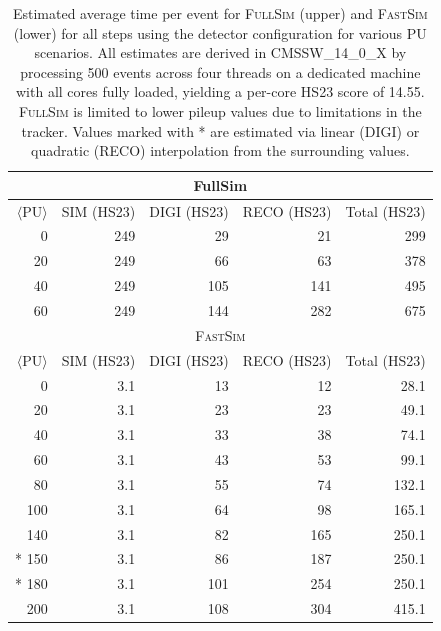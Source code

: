 \begin{table}[tbhp]
    \centering
	\caption{Estimated average time per event for \textsc{FullSim} (upper) and \textsc{FastSim} (lower) for all steps using the \PhaseOne detector configuration for various \gls{PU} scenarios. All estimates are derived in \gls{CMSSW}\_14\_0\_X by processing 500 events across four threads on a dedicated machine with all cores fully loaded, yielding a per-core HS23 score of 14.55. \textsc{FullSim} is limited to lower pileup values due to limitations in the \PhaseOne tracker. Values marked with * are estimated via linear (\gls{DIGI}) or quadratic (\gls{RECO}) interpolation from the surrounding values.}
    \begin{tabular}{|r|r|r|r|r|}
    \multicolumn{5}{c}{FullSim}\\
    \hline
     \rowcolor{tableheader} 
     $\langle \text{PU} \rangle$   & SIM (HS23) & DIGI (HS23) & RECO (HS23) & Total (HS23) \\ \hline
     \cellcolor{tablerowheader} 0  & 249        & 29          & 21          & 299 \\
     \cellcolor{tablerowheader} 20 & 249        & 66          & 63          & 378 \\
     \cellcolor{tablerowheader} 40 & 249        & 105         & 141         & 495 \\
     \cellcolor{tablerowheader} 60 & 249        & 144         & 282         & 675 \\
    \hline
    \multicolumn{5}{c}{\textsc{FastSim}}\\
    \hline
    \rowcolor{tableheader} 
    $\langle \text{PU} \rangle$    & SIM (HS23) & DIGI (HS23) & RECO (HS23) & Total (HS23) \\ \hline
    \cellcolor{tablerowheader}   0   & 3.1        & 13          & 12          & 28.1 \\
    \cellcolor{tablerowheader}   20  & 3.1        & 23          & 23          & 49.1 \\
    \cellcolor{tablerowheader}   40  & 3.1        & 33          & 38          & 74.1 \\
    \cellcolor{tablerowheader}   60  & 3.1        & 43          & 53          & 99.1 \\
    \cellcolor{tablerowheader}   80  & 3.1        & 55          & 74          & 132.1 \\
    \cellcolor{tablerowheader}   100 & 3.1        & 64          & 98          & 165.1 \\
    \cellcolor{tablerowheader}   140 & 3.1        & 82          & 165         & 250.1 \\
    \cellcolor{tablerowheader} * 150 & 3.1        & 86          & 187         & 250.1 \\
    \cellcolor{tablerowheader} * 180 & 3.1        & 101         & 254         & 250.1 \\
    \cellcolor{tablerowheader}   200 & 3.1        & 108         & 304         & 415.1 \\
    \hline
    \end{tabular}
\label{tab:fastsim_time_per_event}
\end{table}

